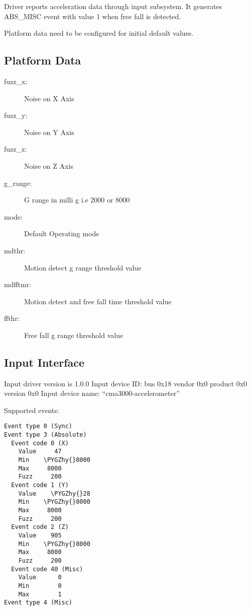 \documentclass[a4paper,8pt,english]{sphinxmanual}
\def\PYGZhy{\char`\-}
\begin{document}
Driver reports acceleration data through input subsystem. It generates ABS\_MISC
event with value 1 when free fall is detected.

Platform data need to be configured for initial default values.


\subsection{Platform Data}
\label{input/devices/cma3000_d0x:platform-data}\begin{description}
\item[{fuzz\_x:}] \leavevmode
Noise on X Axis

\item[{fuzz\_y:}] \leavevmode
Noise on Y Axis

\item[{fuzz\_z:}] \leavevmode
Noise on Z Axis

\item[{g\_range:}] \leavevmode
G range in milli g i.e 2000 or 8000

\item[{mode:}] \leavevmode
Default Operating mode

\item[{mdthr:}] \leavevmode
Motion detect g range threshold value

\item[{mdfftmr:}] \leavevmode
Motion detect and free fall time threshold value

\item[{ffthr:}] \leavevmode
Free fall g range threshold value

\end{description}


\subsection{Input Interface}
\label{input/devices/cma3000_d0x:input-interface}
Input driver version is 1.0.0
Input device ID: bus 0x18 vendor 0x0 product 0x0 version 0x0
Input device name: ``cma3000-accelerometer''

Supported events:

\begin{Verbatim}[commandchars=\\\{\}]
Event type 0 (Sync)
Event type 3 (Absolute)
  Event code 0 (X)
    Value     47
    Min    \PYGZhy{}8000
    Max     8000
    Fuzz     200
  Event code 1 (Y)
    Value    \PYGZhy{}28
    Min    \PYGZhy{}8000
    Max     8000
    Fuzz     200
  Event code 2 (Z)
    Value    905
    Min    \PYGZhy{}8000
    Max     8000
    Fuzz     200
  Event code 40 (Misc)
    Value      0
    Min        0
    Max        1
Event type 4 (Misc)
\end{Verbatim}
\end{document}
